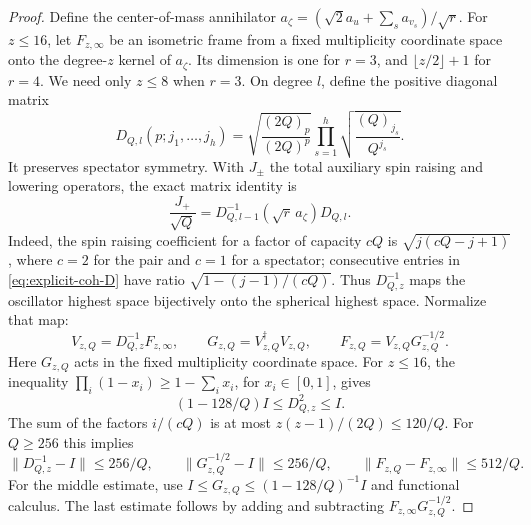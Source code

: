 \documentclass[11pt]{article}
\newcommand{\fall}[2]{(#1)_{#2}}
\begin{document}
\begin{proof}
Define the center-of-mass annihilator
$a_\zeta=(\sqrt2a_u+\sum_sa_{v_s})/\sqrt r$. For $z\le16$, let
$F_{z,\infty}$ be an isometric frame from a fixed multiplicity coordinate
space onto the degree-$z$ kernel of $a_\zeta$. Its dimension is one for
$r=3$, and $\lfloor z/2\rfloor+1$ for $r=4$. We need only $z\le8$
when $r=3$. On degree $l$, define the positive diagonal matrix
\begin{equation}\label{eq:explicit-coh-D}
 D_{Q,l}(p;j_1,\ldots,j_h)
 =\sqrt{\frac{\fall{2Q}p}{(2Q)^p}}
       \prod_{s=1}^h\sqrt{\frac{\fall Q{j_s}}{Q^{j_s}}}.
\end{equation}
It preserves spectator symmetry. With $J_\pm$ the total auxiliary spin
raising and lowering operators, the exact matrix identity is
\begin{equation}\label{eq:explicit-coh-raising}
 \frac{J_+}{\sqrt Q}
 =D_{Q,l-1}^{-1}(\sqrt r\,a_\zeta)D_{Q,l}.
\end{equation}
Indeed, the spin raising coefficient for a factor of capacity $cQ$ is
$\sqrt{j(cQ-j+1)}$, where $c=2$ for the pair and $c=1$ for a
spectator; consecutive entries in \eqref{eq:explicit-coh-D} have ratio
$\sqrt{1-(j-1)/(cQ)}$. Thus $D_{Q,z}^{-1}$ maps the oscillator highest
space bijectively onto the spherical highest space. Normalize that map:
\begin{equation}
 V_{z,Q}=D_{Q,z}^{-1}F_{z,\infty},\qquad
 G_{z,Q}=V_{z,Q}^\dagger V_{z,Q},\qquad
 F_{z,Q}=V_{z,Q}G_{z,Q}^{-1/2}.
\end{equation}
Here $G_{z,Q}$ acts in the fixed multiplicity coordinate space.
For $z\le16$, the inequality
$\prod_i(1-x_i)\ge1-\sum_ix_i$, for $x_i\in[0,1]$, gives
\begin{equation}
 (1-128/Q)I\le D_{Q,z}^2\le I.
\end{equation}
The sum of the factors $i/(cQ)$ is at most
$z(z-1)/(2Q)\le120/Q$. For $Q\ge256$ this implies
\begin{equation}\label{eq:explicit-coh-highest-error}
 \|D_{Q,z}^{-1}-I\|\le256/Q,\qquad
 \|G_{z,Q}^{-1/2}-I\|\le256/Q,\qquad
 \|F_{z,Q}-F_{z,\infty}\|\le512/Q.
\end{equation}
For the middle estimate, use
$I\le G_{z,Q}\le(1-128/Q)^{-1}I$ and functional calculus.
The last estimate follows by adding and subtracting
$F_{z,\infty}G_{z,Q}^{-1/2}$.


\end{proof}
\end{document}
